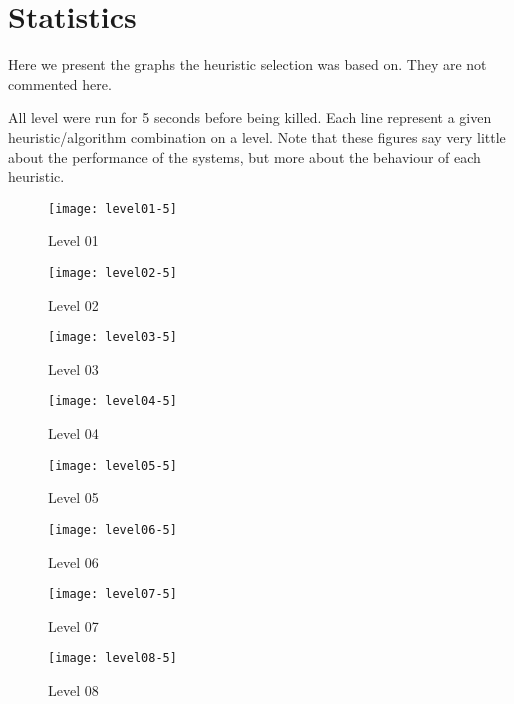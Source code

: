 \chapter{Statistics}
\label{app:results}
Here we present the graphs the heuristic selection was based on. They
are not commented here.

All level were run for 5 seconds before being killed. Each line
represent a given heuristic/algorithm combination on a level. Note
that these figures say very little about the performance of the
systems, but more about the behaviour of each heuristic.


\begin{figure}
  \centering
  \texttt{[image: level01-5]}
  \caption{Level 01}
  \label{fig:level01-stats}
\end{figure}
 
\begin{figure}
  \centering
  \texttt{[image: level02-5]}
  \caption{Level 02}
  \label{fig:level02-stats}
\end{figure}

\begin{figure}
  \centering
  \texttt{[image: level03-5]}
  \caption{Level 03}
  \label{fig:level03-stats}
\end{figure}
 
\begin{figure}
  \centering
  \texttt{[image: level04-5]}
  \caption{Level 04}
  \label{fig:level04-stats}
\end{figure}

\begin{figure}
  \centering
  \texttt{[image: level05-5]}
  \caption{Level 05}
  \label{fig:level05-stats}
\end{figure}
 
\begin{figure}
  \centering
  \texttt{[image: level06-5]}
  \caption{Level 06}
  \label{fig:level06-stats}
\end{figure}

\begin{figure}
  \centering
  \texttt{[image: level07-5]}
  \caption{Level 07}
  \label{fig:level07-stats}
\end{figure}
 
\begin{figure}
  \centering
  \texttt{[image: level08-5]}
  \caption{Level 08}
  \label{fig:level08-stats}
\end{figure}

